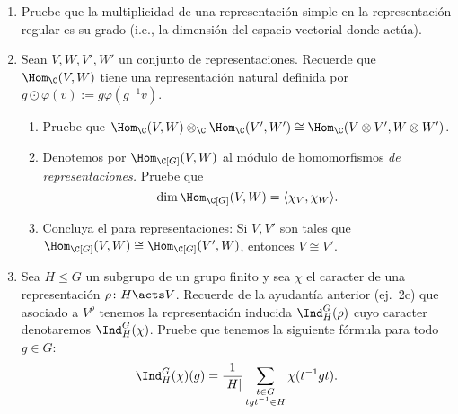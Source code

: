 \documentclass[11pt, reqno]{amsart}
\begin{document}
\begin{enumerate}
	\item Pruebe que la multiplicidad de una representación simple en la representación regular es su grado (i.e., la dimensión del espacio vectorial donde actúa).

		\newex
	\item Sean $V, W, V', W'$ un conjunto de representaciones.
		Recuerde que $\Hom_\C(V, W)$ tiene una representación natural definida por $g\odot\varphi(v) := g \varphi(g^{-1}v)$.
		\begin{enumerate}
			\item Pruebe que $\Hom_\C(V, W) \otimes_\C \Hom_\C(V', W') \cong \Hom_\C(V \otimes V', W \otimes W')$.

			\item Denotemos por $\Hom_{\C[G]}(V, W)$ al módulo de homomorfismos \emph{de representaciones.}
				Pruebe que
				\[
					\dim\Hom_{\C[G]}(V, W) = \langle \chi_V, \chi_W \rangle.
				\]
				
			\item Concluya el  para representaciones:
				Si $V, V'$ son tales que $\Hom_{\C[G]}(V, W) \cong \Hom_{\C[G]}(V', W)$, entonces $V \cong V'$.
		\end{enumerate}



		\newex
	\item Sea $H \le G$ un subgrupo de un grupo finito y sea $\chi$ el caracter de una representación $\rho \colon H \acts V$.
		Recuerde de la ayudantía anterior (ej.~2c) que asociado a $V^\rho$ tenemos la representación inducida $\Ind^G_H(\rho)$ cuyo
		caracter denotaremos $\Ind^G_H(\chi)$.
		Pruebe que tenemos la siguiente fórmula para todo $g \in G$:
		\[
			\Ind_H^G(\chi)(g) = \frac{1}{|H|} \sum_{\substack{t\in G \\ tgt^{-1} \in H}} \chi(t^{-1}gt).
		\]
		\nocite{serre:representations}


\end{enumerate}
\end{document}
